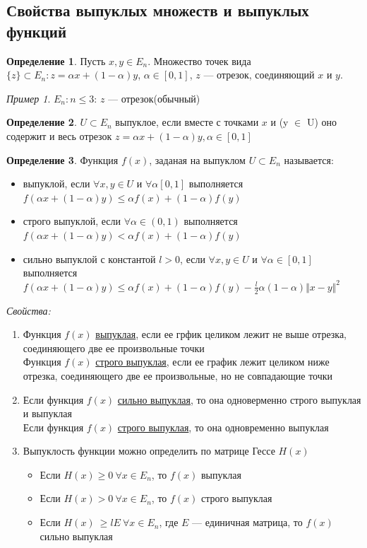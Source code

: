 \documentclass[oneside]{book}
\theoremstyle{plain}
\theoremstyle{remark}
\newtheorem*{examp}{Пример}
\theoremstyle{definition}
\newtheorem*{definition}{Определение}
\begin{document}
\subsection{Свойства выпуклых множеств и выпуклых функций}
\label{sec:orgcea8084}
\begin{definition}
Пусть \(x, y \in E_n\). Множество точек вида \(\{z\} \subset E_n: z = \alpha x + (1 - \alpha)y\), \(\alpha \in [0, 1]\), \(z\) --- отрезок, соединяющий \(x\) и \(y\).
\end{definition}
\begin{examp}
\(E_n: n \le 3\): \(z\) --- отрезок(обычный)
\end{examp}
\begin{definition}
\(U \subset E_n\) выпуклое, если вместе с точками \(x\) и (y \(\in\) U) оно содержит и весь отрезок \(z = \alpha x + (1 - \alpha)y, \alpha \in [0, 1]\)
\end{definition}
\begin{definition}
Функция \(f(x)\), заданая на выпуклом \(U \subset E_n\) называется:
\begin{itemize}
\item выпуклой, если \(\forall x, y \in U\) и \(\forall \alpha [0, 1]\) выполняется \(f(\alpha x + (1 - \alpha)y) \le \alpha f(x) + (1- \alpha)f(y)\)
\item строго выпуклой, если \(\forall \alpha \in (0, 1)\) выполняется \(f(\alpha x + (1 - \alpha)y) < \alpha f(x) + (1-\alpha)f(y)\)
\item сильно выпуклой с константой \(l > 0\), если \(\forall x, y \in U\) и \(\forall \alpha \in [0, 1]\) выполняется \(f(\alpha x + (1 - \alpha)y) \le \alpha f(x) + (1- \alpha) f(y) - \frac{l}{2}\alpha(1 - \alpha)\Vert x - y \Vert^2\)
\end{itemize}
\end{definition}
\emph{Свойства:}
\begin{enumerate}
\item Функция \(f(x)\) \uline{выпуклая}, если ее грфик целиком лежит не выше отрезка, соединяющего две ее произвольные точки \\
Функция \(f(x)\) \uline{строго выпуклая}, если ее график лежит целиком ниже отрезка, соединяющего две ее произвольные, но не совпадающие точки
\item Если функция \(f(x)\) \uline{сильно выпуклая}, то она одноверменно строго выпуклая и выпуклая \\
Если функция \(f(x)\) \uline{строго выпуклая}, то она одновременно выпуклая
\item Выпуклость функции можно определить по матрице Гессе \(H(x)\)
\begin{itemize}
\item Если \(H(x) \ge 0\ \forall x \in E_n\), то \(f(x)\) выпуклая
\item Если \(H(x) > 0\ \forall x\in E_n\), то \(f(x)\) строго выпуклая
\item Если \(H(x)\ \ge lE\ \forall x \in E_n\), где \(E\) --- единичная матрица, то \(f(x)\) сильно выпуклая
\end{itemize}
\end{enumerate}
\end{document}
